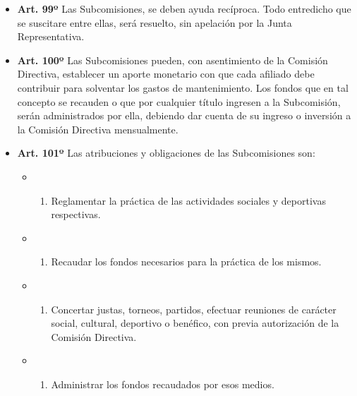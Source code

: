 \documentclass[openany]{book}
\providecommand{\tightlist}{%
  \setlength{\itemsep}{0pt}\setlength{\parskip}{0pt}}
\begin{document}
\begin{itemize}
\tightlist
\item
  \textbf{Art. 99º}
  Las Subcomisiones, se deben ayuda recíproca. Todo entredicho que se suscitare entre ellas, será resuelto, sin apelación por la Junta Representativa.
\end{itemize}

\begin{itemize}
\tightlist
\item
  \textbf{Art. 100º}
  Las Subcomisiones pueden, con asentimiento de la Comisión Directiva, establecer un aporte monetario con que cada afiliado debe contribuir para solventar los gastos de mantenimiento. Los fondos que en tal concepto se recauden o que por cualquier título ingresen a la Subcomisión, serán administrados por ella, debiendo dar cuenta de su ingreso o inversión a la Comisión Directiva mensualmente.
\end{itemize}

\begin{itemize}
\tightlist
\item
  \textbf{Art. 101º}
  Las atribuciones y obligaciones de las Subcomisiones son:

  \begin{itemize}
  \item
    \begin{enumerate}
    \def\labelenumi{\alph{enumi})}
    \tightlist
    \item
      Reglamentar la práctica de las actividades sociales y deportivas respectivas.
    \end{enumerate}
  \item
    \begin{enumerate}
    \def\labelenumi{\alph{enumi})}
    \setcounter{enumi}{1}
    \tightlist
    \item
      Recaudar los fondos necesarios para la práctica de los mismos.
    \end{enumerate}
  \item
    \begin{enumerate}
    \def\labelenumi{\alph{enumi})}
    \setcounter{enumi}{2}
    \tightlist
    \item
      Concertar justas, torneos, partidos, efectuar reuniones de carácter social, cultural, deportivo o benéfico, con previa autorización de la Comisión Directiva.
    \end{enumerate}
  \item
    \begin{enumerate}
    \def\labelenumi{\alph{enumi})}
    \setcounter{enumi}{3}
    \tightlist
    \item
      Administrar los fondos recaudados por esos medios.
    \end{enumerate}
  \end{itemize}
\end{itemize}
\end{document}
